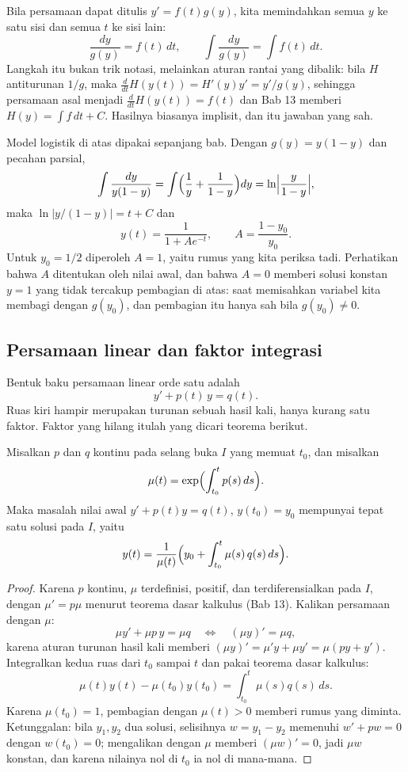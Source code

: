 Bila persamaan dapat ditulis $y'=f(t)g(y)$, kita memindahkan semua $y$ ke satu
sisi dan semua $t$ ke sisi lain:
\[
\frac{dy}{g(y)}=f(t)\,dt,\qquad \int\frac{dy}{g(y)}=\int f(t)\,dt .
\]
Langkah itu bukan trik notasi, melainkan aturan rantai yang dibalik: bila $H$
antiturunan $1/g$, maka $\frac{d}{dt}H(y(t))=H'(y)y'=y'/g(y)$, sehingga
persamaan asal menjadi $\frac{d}{dt}H(y(t))=f(t)$ dan Bab 13 memberi
$H(y)=\int f\,dt+C$. Hasilnya biasanya implisit, dan itu jawaban yang sah.

Model logistik di atas dipakai sepanjang bab. Dengan
$g(y)=y(1-y)$ dan pecahan parsial,
\[
\int\frac{dy}{y(1-y)}=\int\Bigl(\frac{1}{y}+\frac{1}{1-y}\Bigr)dy
=\ln\Bigl|\frac{y}{1-y}\Bigr| ,
\]
maka $\ln|y/(1-y)|=t+C$ dan
\[
y(t)=\frac{1}{1+Ae^{-t}},\qquad A=\frac{1-y_{0}}{y_{0}} .
\]
Untuk $y_{0}=1/2$ diperoleh $A=1$, yaitu rumus yang kita periksa tadi. Perhatikan
bahwa $A$ ditentukan oleh nilai awal, dan bahwa $A=0$ memberi solusi konstan $y=1$
yang tidak tercakup pembagian di atas: saat memisahkan variabel kita membagi
dengan $g(y_{0})$, dan pembagian itu hanya sah bila $g(y_{0})\ne0$.

\subsection{Persamaan linear dan faktor integrasi}

Bentuk baku persamaan linear orde satu adalah
\[
y'+p(t)\,y=q(t).
\]
Ruas kiri hampir merupakan turunan sebuah hasil kali, hanya kurang satu faktor.
Faktor yang hilang itulah yang dicari teorema berikut.

\begin{teorema}
Misalkan $p$ dan $q$ kontinu pada selang buka $I$ yang memuat $t_{0}$, dan
misalkan
\[
\mu(t)=\exp\Bigl(\int_{t_{0}}^{t}p(s)\,ds\Bigr).
\]
Maka masalah nilai awal $y'+p(t)y=q(t)$, $y(t_{0})=y_{0}$ mempunyai tepat satu
solusi pada $I$, yaitu
\[
y(t)=\frac{1}{\mu(t)}\Bigl(y_{0}+\int_{t_{0}}^{t}\mu(s)\,q(s)\,ds\Bigr).
\]
\end{teorema}

\begin{proof}
Karena $p$ kontinu, $\mu$ terdefinisi, positif, dan terdiferensialkan pada $I$,
dengan $\mu'=p\mu$ menurut teorema dasar kalkulus (Bab 13). Kalikan persamaan
dengan $\mu$:
\[
\mu y'+\mu p\,y=\mu q
\quad\Longleftrightarrow\quad
(\mu y)'=\mu q ,
\]
karena aturan turunan hasil kali memberi $(\mu y)'=\mu'y+\mu y'=\mu(py+y')$.
Integralkan kedua ruas dari $t_{0}$ sampai $t$ dan pakai teorema dasar kalkulus:
\[
\mu(t)y(t)-\mu(t_{0})y(t_{0})=\int_{t_{0}}^{t}\mu(s)q(s)\,ds .
\]
Karena $\mu(t_{0})=1$, pembagian dengan $\mu(t)>0$ memberi rumus yang diminta.
Ketunggalan: bila $y_{1},y_{2}$ dua solusi, selisihnya $w=y_{1}-y_{2}$ memenuhi
$w'+pw=0$ dengan $w(t_{0})=0$; mengalikan dengan $\mu$ memberi $(\mu w)'=0$,
jadi $\mu w$ konstan, dan karena nilainya nol di $t_{0}$ ia nol di mana-mana.
\end{proof}

